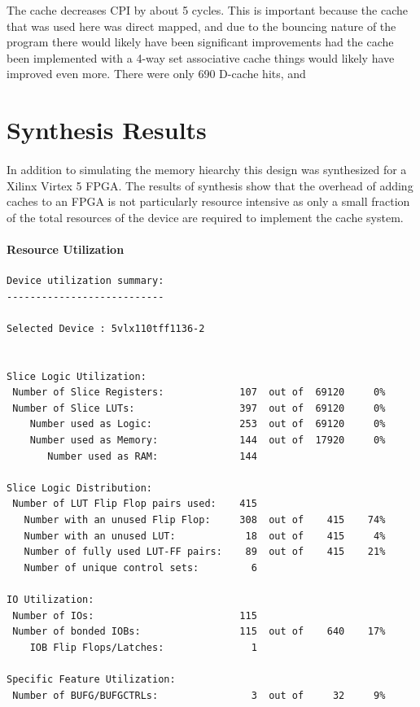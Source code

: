\documentclass[11pt,letterpaper,]{article}
\begin{document}
The cache decreases CPI by about 5 cycles.  This is important because the cache that was used here was direct mapped, and due to the bouncing nature of the program there would likely have been significant improvements had the cache been implemented with a 4-way set associative cache things would likely have improved even more. There were only 690 D-cache hits, and 



\section{ Synthesis Results }
\label{Results:Synthesis}
\paragraph{}
In addition to simulating the memory hiearchy this design was synthesized for a Xilinx Virtex 5 FPGA.  The results of synthesis show that the overhead of adding caches to an FPGA is not particularly resource intensive as only a small fraction of the total resources of the device are required to implement the cache system.
\paragraph{ Resource Utilization }

\begin{verbatim}
Device utilization summary:
---------------------------

Selected Device : 5vlx110tff1136-2 


Slice Logic Utilization: 
 Number of Slice Registers:             107  out of  69120     0%  
 Number of Slice LUTs:                  397  out of  69120     0%  
    Number used as Logic:               253  out of  69120     0%  
    Number used as Memory:              144  out of  17920     0%  
       Number used as RAM:              144

Slice Logic Distribution: 
 Number of LUT Flip Flop pairs used:    415
   Number with an unused Flip Flop:     308  out of    415    74%  
   Number with an unused LUT:            18  out of    415     4%  
   Number of fully used LUT-FF pairs:    89  out of    415    21%  
   Number of unique control sets:         6

IO Utilization: 
 Number of IOs:                         115
 Number of bonded IOBs:                 115  out of    640    17%  
    IOB Flip Flops/Latches:               1

Specific Feature Utilization:
 Number of BUFG/BUFGCTRLs:                3  out of     32     9%  
\end{verbatim}
\end{document}
